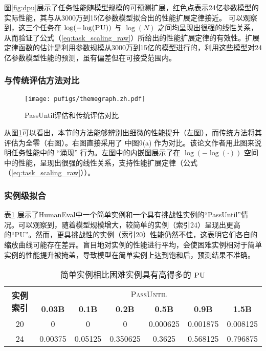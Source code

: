 图\ref{fig:dpu}展示了任务性能随模型规模的可预测扩展，{\color[rgb]{0.85,0.25,0.25}红色}点表示24亿参数模型的实际性能，其与从3000万到15亿参数模型拟合出的性能扩展定律接近。 可以观察到，这三个任务在 $\log(-\log(\textsc{PU}))$ 与 $\log(N)$ 之间均呈现出很强的线性关系，从而验证了公式（\ref{eq:task_scaling_raw}）所给出的性能扩展定律的有效性。扩展定律函数的估计是利用参数规模从3000万到15亿的模型进行的，利用这些模型对24亿参数模型性能的预测，虽有偏差但在可接受范围内。

\subsubsection{与传统评估方法对比}
\begin{figure}[!htbp]
    \centering
    \texttt{[image: pufigs/themegraph.zh.pdf]}
\caption{PassUntil评估和传统评估对比}
\label{fig:themefig}
\end{figure}

从图\ref{fig:themefig}可以看出，本节的方法能够辨别出细微的性能提升（左图），而传统方法将其评估为全零（右图）。右图直接采用了 \citet{sorscher2022beyond} 中图9(a) 作为对比。该论文作者用此图来说明任务性能中的 “涌现” 行为。左图中的内嵌图展示了在 $\log(-\log(\cdot))$ 空间中的性能，呈现出很强的线性关系，支持性能扩展定律（公式（\ref{eq:task_scaling_raw}））。



\subsubsection{实例级拟合}

表\ref{tab:easyhardinstances} 展示了HumanEval中一个简单实例和一个具有挑战性实例的“PassUntil”情况。可以观察到，随着模型规模增大，较简单的实例（索引24）呈现出更高的“PU”。然而，更具挑战性的实例（索引20）性能仍然不佳，这表明它们各自的缩放曲线可能存在差异。盲目地对实例的性能进行平均，会使困难实例相对于简单实例的性能提升被掩盖，导致模型在简单实例上达到饱和后，预测结果不准确。

\begin{table}[h]
    \centering
    \caption{简单实例相比困难实例具有高得多的 $\textsc{PU}$}
    \begin{tabular}{c|cccccc}
    \toprule
        \multirow{2}{*}{\textbf{实例索引}}  & \multicolumn{6}{c}{\textsc{PassUntil}}   \\
        \cline{2 - 7}
        & \textbf{0.03B} & \textbf{0.1B} & \textbf{0.2B} & \textbf{0.5B} & \textbf{0.9B} & \textbf{1.5B} \\
        \midrule
        20 & 0 & 0 & 0 & 0.000625 & 0.001875 & 0.008125 \\
        24 & 0.00375 & 0.05125 & 0.350625 & 0.3625 & 0.568125 & 0.796875 \\
         \bottomrule
    \end{tabular}
    \label{tab:easyhardinstances}
\end{table}

